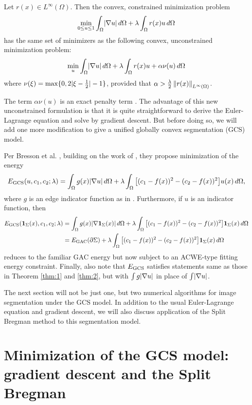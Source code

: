 \begin{thm}
	Let $r(x) \in L^\infty(\Omega)$. Then the convex, constrained minimization problem
	\begin{align*}
	\min_{0 \leq u \leq 1} \int_{\Omega} \lvert\nabla u\rvert \,d\Omega + \lambda \int_{\Omega} r(x) u \,d\Omega 
	\end{align*}
	has the same set of minimizers as the following convex, unconstrained minimization problem:
	\begin{align*}
	\min_u \int_{\Omega} \lvert\nabla u\rvert \,d\Omega + \lambda \int_{\Omega} r(x) u + \alpha \nu(u) \,d\Omega 
	\end{align*}
	where $\nu(\xi) = \max\{ 0 , 2\lvert\xi - \frac{1}{2} \rvert - 1\}$, provided that $\alpha > \frac{\lambda}{2}\left\lVert r(x)\right\rVert_{L^\infty(\Omega)}$.
	\label{thm:2}
\end{thm}
The term $\alpha\nu(u)$ is an exact penalty term \cite{hiriart1993convexI,hiriart1993convexII}. The advantage of this new unconstrained formulation is that it is quite straightforward to derive the Euler-Lagrange equation and solve by gradient descent. But before doing so, we will add one more modification to give a unified globally convex segmentation (GCS) model.

Per Bresson et al. \cite{bresson2007fast}, building on the work of \cite{chan2006algorithms}, they propose minimization of the energy 
\begin{align}
E_\textrm{GCS}(u, c_1, c_2; \lambda) = 
\int_{\Omega} g(x)  \lvert\nabla u\rvert \,d\Omega 
+ \lambda\int_{\Omega} \big[ (c_1 - f(x) )^2 - (c_2 - f(x))^2 \big] u(x) \,d\Omega,
\end{align}
where $g$ is an edge indicator function as in . Furthermore, if $u$ is an indicator function, then
\begin{align*}
E_\textrm{GCS}(\mathbf{1}_\Sigma(x), c_1, c_2; \lambda) 
&= \int_{\Omega} g(x)  \lvert\nabla \mathbf{1}_\Sigma(x)\rvert \,d\Omega 
+ \lambda\int_{\Omega} \big[ (c_1 - f(x) )^2 - (c_2 - f(x))^2 \big] \mathbf{1}_\Sigma(x) \,d\Omega
\\
&= E_\textrm{GAC}(\partial \Sigma) +  \lambda\int_{\Omega} \big[ (c_1 - f(x) )^2 - (c_2 - f(x))^2 \big] \mathbf{1}_\Sigma(x) \,d\Omega
\end{align*}
reduces to the familiar GAC energy but now subject to an ACWE-type fitting energy constraint. Finally, also note that $E_\textrm{GCS}$ satisfies statements same as those in Theorem \ref{thm:1} and \ref{thm:2}, but with $\int g\lvert\nabla u\rvert$ in place of $\int \lvert\nabla u\rvert$.

The next section will not be just one, but two numerical algorithms for image segmentation under the GCS model. In addition to the usual Euler-Lagrange equation and gradient descent, we will also discuss application of the Split Bregman method \cite{goldstein2010geometric,goldstein2009split} to this segmentation model.

\section{Minimization of the GCS model: gradient descent and the Split Bregman}

